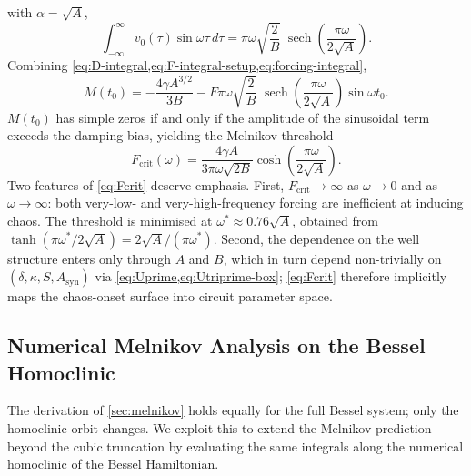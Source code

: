 \documentclass[11pt, a4paper]{article}
\newcommand{\sech}{\operatorname{sech}}
\begin{document}
%
with $\alpha = \sqrt{A}$,
%
\begin{equation}
\label{eq:forcing-integral}
\int_{-\infty}^{\infty} v_0(\tau)\sin\omega\tau\,d\tau
  = \pi\omega\sqrt{\frac{2}{B}}\;\sech\left(\frac{\pi\omega}{2\sqrt{A}}\right).
\tag{30}
\end{equation}
%
Combining \cref{eq:D-integral,eq:F-integral-setup,eq:forcing-integral},
%
\begin{equation}
\label{eq:melnikov-final}
\boxed{
M(t_0)
  = -\frac{4\gamma A^{3/2}}{3B}
  - F\pi\omega\sqrt{\frac{2}{B}}\;\sech\left(\frac{\pi\omega}{2\sqrt{A}}\right)
    \sin\omega t_0.
}
\tag{31}
\end{equation}
%
$M(t_0)$ has simple zeros if and only if the amplitude of the sinusoidal term
exceeds the damping bias, yielding the Melnikov threshold
%
\begin{equation}
\label{eq:Fcrit}
\boxed{
F_{\mathrm{crit}}(\omega)
  = \frac{4\gamma A}{3\pi\omega\sqrt{2B}}
    \cosh\left(\frac{\pi\omega}{2\sqrt{A}}\right).
}
\tag{32}
\end{equation}
%
Two features of \cref{eq:Fcrit} deserve emphasis.  First, $F_{\mathrm{crit}}
\to \infty$ as $\omega \to 0$ and as $\omega \to \infty$: both very-low-
and very-high-frequency forcing are inefficient at inducing chaos.  The threshold
is minimised at $\omega^* \approx 0.76\sqrt{A}$, obtained from
$\tanh(\pi\omega^*/2\sqrt{A}) = 2\sqrt{A}/(\pi\omega^*)$.  Second, the
dependence on the well structure enters only through $A$ and $B$, which in turn
depend non-trivially on $(\delta, \kappa, S, A_{\mathrm{syn}})$ via
\cref{eq:Uprime,eq:Utriprime-box}; \cref{eq:Fcrit} therefore implicitly maps the
chaos-onset surface into circuit parameter space.


\subsection{Numerical Melnikov Analysis on the Bessel Homoclinic}
\label{sec:numerical-melnikov}

The derivation of \cref{sec:melnikov} holds equally for the full Bessel system;
only the homoclinic orbit changes.  We exploit this to extend the Melnikov
prediction beyond the cubic truncation by evaluating the same integrals along
the numerical homoclinic of the Bessel Hamiltonian.
\end{document}
